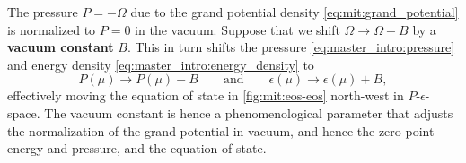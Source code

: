 The pressure $P = -\Omega$ due to the grand potential density \eqref{eq:mit:grand_potential} is normalized to $P = 0$ in the vacuum.
Suppose that we shift $\Omega \rightarrow \Omega + B$ by a \textbf{vacuum constant} $B$.
This in turn shifts the pressure \eqref{eq:master_intro:pressure} and energy density \eqref{eq:master_intro:energy_density} to
\begin{equation}
	P(\mu) \rightarrow P(\mu) - B
	\qquad \text{and} \qquad
	\epsilon(\mu) \rightarrow \epsilon(\mu) + B,
\label{eq:mit:bag_shift}
\end{equation}
effectively moving the equation of state in \cref{fig:mit:eos-eos} north-west in $P$-$\epsilon$-space.
The vacuum constant is hence a phenomenological parameter
that adjusts the normalization of the grand potential in vacuum,
and hence the zero-point energy and pressure, and the equation of state.

